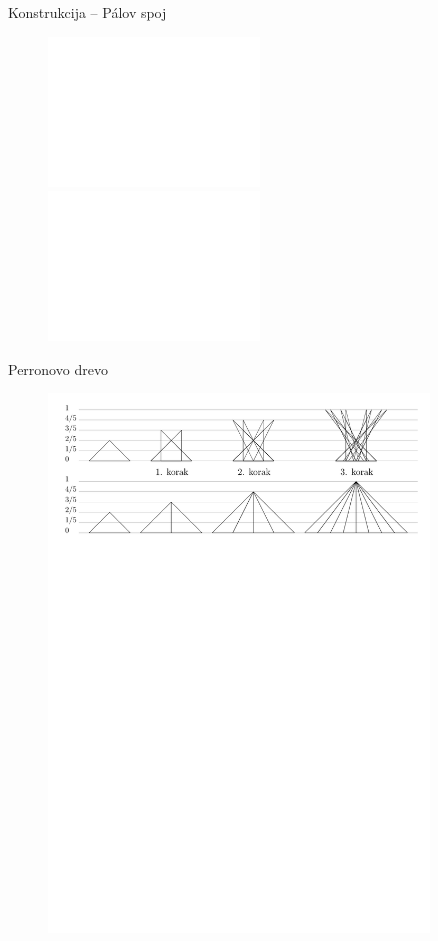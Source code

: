 \documentclass{beamer}
\begin{document}

\begin{frame}{Konstrukcija -- Pálov spoj}
    \begin{figure}
        \centering
        \includegraphics<1>[width=0.5\textwidth]{ipe_slike/pal1.pdf}
        \includegraphics<2>[width=0.5\textwidth]{ipe_slike/pal2.pdf}
    \end{figure}
\end{frame}


\begin{frame}{Perronovo drevo}
    \begin{figure}
        \centering
        \includegraphics[width=0.9\textwidth]{ipe_slike/lastnost2.pdf}
    \end{figure}
\end{frame}

\end{document}

